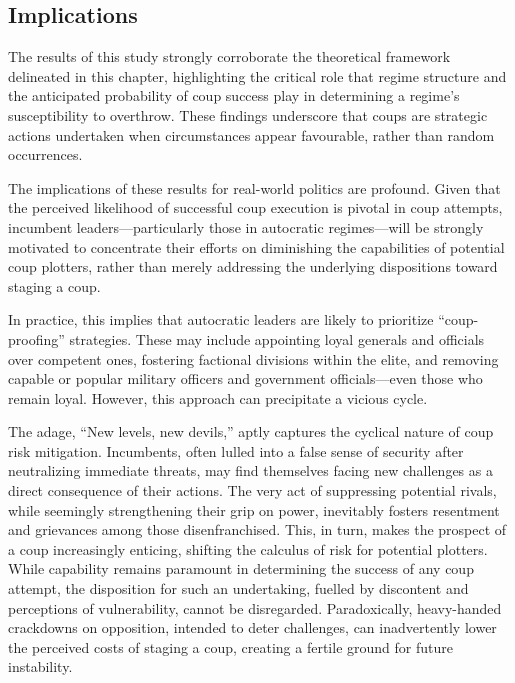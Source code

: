\documentclass[
  12pt,
]{report}
\begin{document}
\subsection{Implications}\label{implications}

The results of this study strongly corroborate the theoretical framework
delineated in this chapter, highlighting the critical role that regime
structure and the anticipated probability of coup success play in
determining a regime's susceptibility to overthrow. These findings
underscore that coups are strategic actions undertaken when
circumstances appear favourable, rather than random occurrences.

The implications of these results for real-world politics are profound.
Given that the perceived likelihood of successful coup execution is
pivotal in coup attempts, incumbent leaders---particularly those in
autocratic regimes---will be strongly motivated to concentrate their
efforts on diminishing the capabilities of potential coup plotters,
rather than merely addressing the underlying dispositions toward staging
a coup.

In practice, this implies that autocratic leaders are likely to
prioritize ``coup-proofing'' strategies. These may include appointing
loyal generals and officials over competent ones, fostering factional
divisions within the elite, and removing capable or popular military
officers and government officials---even those who remain loyal.
However, this approach can precipitate a vicious cycle.

The adage, ``New levels, new devils,'' aptly captures the cyclical
nature of coup risk mitigation. Incumbents, often lulled into a false
sense of security after neutralizing immediate threats, may find
themselves facing new challenges as a direct consequence of their
actions. The very act of suppressing potential rivals, while seemingly
strengthening their grip on power, inevitably fosters resentment and
grievances among those disenfranchised. This, in turn, makes the
prospect of a coup increasingly enticing, shifting the calculus of risk
for potential plotters. While capability remains paramount in
determining the success of any coup attempt, the disposition for such an
undertaking, fuelled by discontent and perceptions of vulnerability,
cannot be disregarded. Paradoxically, heavy-handed crackdowns on
opposition, intended to deter challenges, can inadvertently lower the
perceived costs of staging a coup, creating a fertile ground for future
instability.
\end{document}
